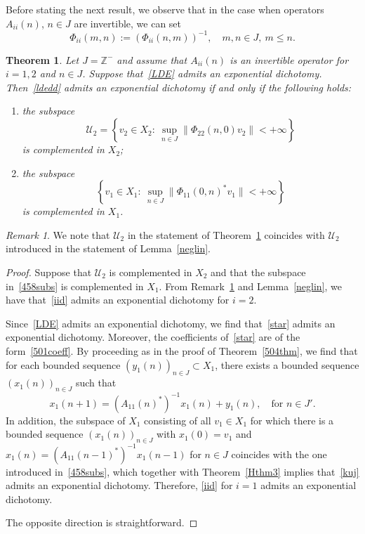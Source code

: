 \documentclass[11pt,reqno,a4paper]{amsart}
\theoremstyle{plain}
\numberwithin{equation}{section}
\newtheorem{theorem}{Theorem}
\theoremstyle{remark}
\newtheorem{remark}{Remark}
\begin{document}
Before stating the next result, we observe that in the case when operators $A_{ii}(n)$, $n\in J$ are invertible, we can set
\[
\Phi_{ii}(m, n):= (\Phi_{ii}(n, m))^{-1}, \quad m, n\in J, \ m \le n.
\]
\begin{theorem}\label{456thm}
Let $J=\mathbb Z^-$ and assume that $A_{ii}(n)$ is an invertible operator for $i=1, 2$ and $n\in J$. Suppose that~\eqref{LDE} admits an exponential dichotomy. Then~\eqref{ldedd} admits an exponential dichotomy if and only if  the following holds:
\begin{enumerate}
 \item the subspace
 \[
 \mathcal U_2=\left \{v_2\in X_2: \ \sup_{n\in J}\|\Phi_{22}(n, 0)v_2\|<+\infty \right \}
 \]
 is complemented in $X_2$;
 
\item the subspace
 \begin{equation}\label{458subs}
 \left \{v_1\in X_1: \ \sup_{n\in J}\|\Phi_{11}(0, n)^*v_1\|<+\infty \right \}
 \end{equation}
  is complemented in $X_1$.
\end{enumerate}
\end{theorem}

\begin{remark}\label{459rem}
We note that $\mathcal U_2$ in the statement of Theorem~\ref{456thm} coincides with $\mathcal U_2$ introduced in the statement of Lemma~\ref{neglin}.
\end{remark}

\begin{proof}
Suppose that $\mathcal U_2$ is complemented in $X_2$ and that the subspace in~\eqref{458subs} is complemented in $X_1$. From Remark~\ref{459rem} and Lemma~\ref{neglin}, we have that~\eqref{iid} admits an exponential dichotomy for $i=2$.

Since~\eqref{LDE} admits an exponential dichotomy, we find that~\eqref{star} admits an exponential dichotomy. Moreover, the coefficients of~\eqref{star} are of the form~\eqref{501coeff}. By proceeding as in the proof of Theorem~\ref{504thm}, we find that for each bounded sequence $(y_1(n))_{n\in J}\subset X_1$, there exists a bounded sequence $(x_1(n))_{n\in J}$ such that 
\[
x_1(n+1)=(A_{11}(n)^*)^{-1}x_1(n)+y_1(n), \quad \text{for $n\in J'$.}
\]
In addition, the subspace of $X_1$ consisting of all $v_1\in X_1$ for which there is a bounded sequence $(x_1(n))_{n\in J}$ with $x_1(0)=v_1$ and $x_1(n)=(A_{11}(n-1)^*)^{-1}x_1(n-1)$ for $n\in J$ coincides with the one introduced in~\eqref{458subs}, which together with Theorem~\ref{Hthm3} implies that~\eqref{kuj} admits an exponential dichotomy. Therefore, \eqref{iid} for $i=1$ admits an exponential dichotomy. 

The opposite direction is straightforward. 
\end{proof}
\end{document}
